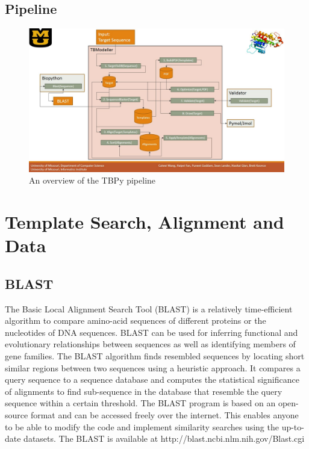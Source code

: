 \documentclass{article}
\begin{document}
\subsection{Pipeline}
\begin{figure}[H]
\begin{center}
\includegraphics[width=\textwidth]{workflow}
\caption{An overview of the TBPy pipeline}
\label{Fig:blosum}
\end{center}
\end{figure}

\section{Template Search, Alignment and Data}

\subsection{BLAST}

The Basic Local Alignment Search Tool (BLAST) is a relatively time-efficient algorithm to compare amino-acid sequences of different proteins or the nucleotides of DNA sequences. BLAST can be used for inferring functional and evolutionary relationships between sequences as well as identifying members of gene families. The BLAST algorithm finds resembled sequences by locating short similar regions between two sequences using a heuristic approach. It compares a query sequence to a sequence database and computes the statistical significance of alignments to find sub-sequence in the database that resemble the query sequence within a certain threshold. The BLAST program is based on an open-source format and can be accessed freely over the internet. This enables anyone to be able to modify the code and implement similarity searches using the up-to-date datasets.
The BLAST is available at http://blast.ncbi.nlm.nih.gov/Blast.cgi
\end{document}
